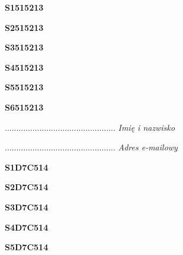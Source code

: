 \begin{turn}{90}\huge \textbf{S1515213}\end{turn}

\begin{turn}{90}\huge \textbf{S2515213}\end{turn}

\begin{turn}{90}\huge \textbf{S3515213}\end{turn}

\begin{turn}{90}\huge \textbf{S4515213}\end{turn}

\begin{turn}{90}\huge \textbf{S5515213}\end{turn}

\begin{turn}{90}\huge \textbf{S6515213}\end{turn}

\begin{turn}{90}\begin{minipage}{\linewidth} \vspace{20mm} ................................................  \textit{Imię i nazwisko}\end{minipage}\end{turn}

\begin{turn}{90}\begin{minipage}{\linewidth} \vspace{20mm} ................................................  \textit{Adres e-mailowy}\end{minipage}\end{turn}

\begin{turn}{90}\huge \textbf{S1D7C514}\end{turn}

\begin{turn}{90}\huge \textbf{S2D7C514}\end{turn}

\begin{turn}{90}\huge \textbf{S3D7C514}\end{turn}

\begin{turn}{90}\huge \textbf{S4D7C514}\end{turn}

\begin{turn}{90}\huge \textbf{S5D7C514}\end{turn}

